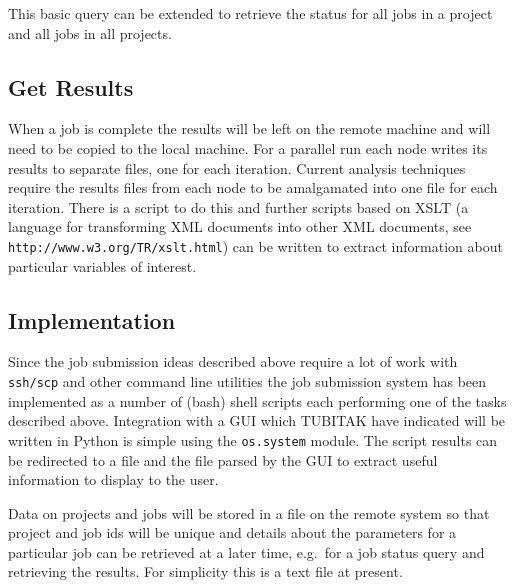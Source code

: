 This basic query can be extended to retrieve the status for all jobs in a project and all jobs in all projects.

\subsection{Get Results}

When a job is complete the results will be left on the remote machine and will need to be copied to the local machine. For a parallel run each node writes its results to separate files, one for each iteration. Current analysis techniques require the results files from each node to be amalgamated into one file for each iteration. There is a script to do this and further scripts based on XSLT (a language for transforming XML documents into other XML documents, see \verb+http://www.w3.org/TR/xslt.html+) can be written to extract information about particular variables of interest.

\subsection{Implementation}

Since the job submission ideas described above require a lot of work with \texttt{ssh/scp} and other command line utilities the job submission system has been implemented as a number of (bash) shell scripts each performing one of the tasks described above. Integration with a GUI which TUBITAK have indicated will be written in Python is simple using the \texttt{os.system} module. The script results can be redirected to a file and the file parsed by the GUI to extract useful information to display to the user.

Data on projects and jobs will be stored in a file on the remote system so that project and job ids will be unique and details about the parameters for a particular job can be retrieved at a later time, e.g.\ for a job status query and retrieving the results. For simplicity this is a text file at present.
